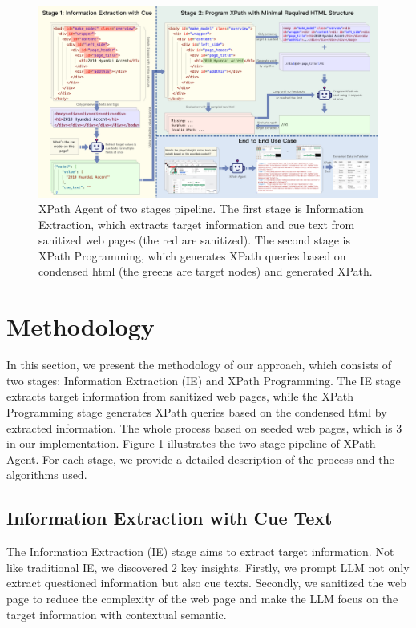 \documentclass[a4paper]{article}
\begin{document}
\begin{figure}[h]
  \centering
  \includegraphics[width=1\textwidth]{./workflow.png}
  \caption{XPath Agent of two stages pipeline. The first stage is Information Extraction, which extracts target information and cue text from sanitized web pages (the red are sanitized). The second stage is XPath Programming, which generates XPath queries based on condensed html (the greens are target nodes) and generated XPath.}
  \label{fig:workflow}
  \vspace{20pt} %
\end{figure}

\section{Methodology}

In this section, we present the methodology of our approach, which consists of two stages: Information Extraction (IE) and XPath Programming. The IE stage extracts target information from sanitized web pages, while the XPath Programming stage generates XPath queries based on the condensed html by extracted information. The whole process based on seeded web pages, which is 3 in our implementation. Figure \ref{fig:workflow} illustrates the two-stage pipeline of XPath Agent. For each stage, we provide a detailed description of the process and the algorithms used.

\subsection{Information Extraction with Cue Text}

The Information Extraction (IE) stage aims to extract target information. Not like traditional IE, we discovered 2 key insights. Firstly, we prompt LLM not only extract questioned information but also cue texts. Secondly, we sanitized the web page to reduce the complexity of the web page and make the LLM focus on the target information with contextual semantic.
\end{document}
